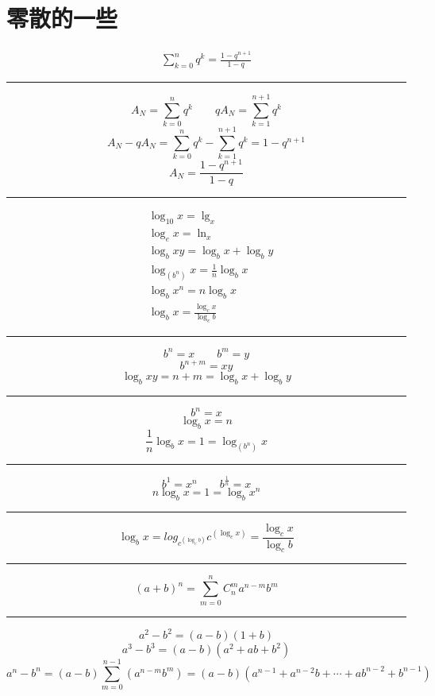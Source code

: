 \section{零散的一些}
\begin{align}
\sum\limits_{k=0}^{n}q^k = \frac{1-q^{n+1}}{1-q}
\end{align}
\noindent\rule{\textwidth}{0.4pt}
$$A_N = \sum\limits_{k = 0}^{n}q^k \qquad qA_N = \sum\limits_{k = 1}^{n+1}q^k$$
$$A_N - qA_N = \sum\limits_{k = 0}^{n}q^k -\sum\limits_{k=1}^{n+1}q^k = 1-q^{n+1}$$
$$A_N = \frac{1-q^{n+1}}{1-q}$$
\noindent\rule{\textwidth}{0.4pt}

\begin{align}
&\log_{10}{x} = \lg_{x} \\
&\log_{e}{x} = \ln_{x}\\
&\log_{b}{xy} = \log_{b}{x} + \log_{b}{y}\\
&\log_{\left(b^n\right)}{x} = \frac{1}{n}\log_{b}{x} \\
&\log_{b}{x^n} = n\log_{b}{x} \\
&\log_{b}{x} = \frac{\log_{c}{x}}{\log_{c}{b}}
\end{align}
\noindent\rule{\textwidth}{0.4pt}
$$b^n = x\qquad b^m =y$$
$$b^{n+m} = xy$$
$$\log_{b}{xy} = n + m = \log_{b}{x} + \log_{b}{y}$$
\noindent\rule{\textwidth}{0.4pt}
$$b^n = x$$
$$\log_{b}{x} = n$$
$$\frac{1}{n}\log_{b}{x}= 1 = \log_{\left(b^n\right)}{x}$$
\noindent\rule[\fill]{\textwidth}{0.4pt}
$$b^1 = x^n \qquad b^{\frac{1}{n}} = x$$
$$n\log_{b}{x} = 1 = \log_{b}{x^n}$$
\noindent\rule[\fill]{\textwidth}{0.4pt}
$$\log_{b}{x} = log_{c^{\left(\log_{c}{b}\right)}}{c^{\left(\log_{c}{x}\right)}}=\frac{\log_{c}{x}}{\log_{c}{b}}$$
\noindent\rule[\fill]{\textwidth}{0.4pt}
$$\left(a+b\right)^n=\sum_{m = 0}^{n} C_n^m a^{n-m}b^m $$
\noindent\rule[\fill]{\textwidth}{0.4pt}
$$a^2-b^2=\left(a-b\right)\left(1+b\right)$$
$$a^3-b^3=\left(a-b\right)\left(a^2+ab+b^2\right)$$
$$a^n-b^n=\left(a-b\right)\sum_{m=0}^{n-1}\left(a^{n-m}b^{m}\right)=\left(a-b\right)\left(a^{n-1}+a^{n-2}b+\cdots+ab^{n-2}+b^{n-1}\right)$$